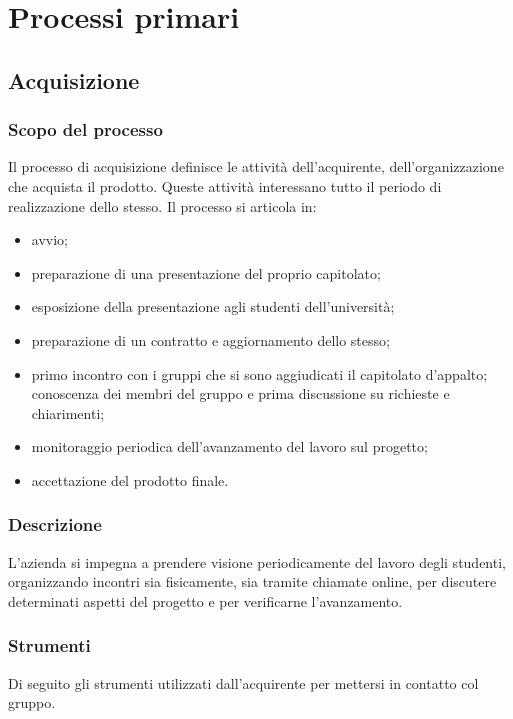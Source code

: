 \section{Processi primari}
\subsection{Acquisizione}
\subsubsection{Scopo del processo}
Il processo di acquisizione definisce le attività dell'acquirente, dell'organizzazione che acquista il prodotto. Queste attività interessano tutto il periodo di realizzazione dello stesso.
Il processo si articola in:
\begin{itemize}
	\item avvio;
	\item preparazione di una presentazione del proprio capitolato;
	\item esposizione della presentazione agli studenti dell'università;
	\item preparazione di un contratto e aggiornamento dello stesso;
	\item primo incontro con i gruppi che si sono aggiudicati il capitolato d'appalto; conoscenza dei membri del gruppo e prima discussione su richieste e chiarimenti;
	\item monitoraggio periodica dell'avanzamento del lavoro sul progetto;
	\item accettazione del prodotto finale.
\end{itemize}
\subsubsection{Descrizione}
L'azienda si impegna a prendere visione periodicamente del lavoro degli studenti, organizzando incontri sia fisicamente, sia tramite chiamate online,
per discutere determinati aspetti del progetto e per verificarne l'avanzamento.
\subsubsection{Strumenti}
Di seguito gli strumenti utilizzati dall'acquirente per mettersi in contatto col gruppo.
\pagebreak
